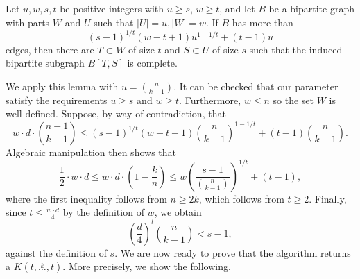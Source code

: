 \documentclass[12pt]{article}
\newcommand{\compoverset}[2]{\ensuremath{K(#2, \overset{#1}{\dots}, #2)}}
\begin{document}
\begin{lemma}\label{thm:kst}
    Let $u, w, s, t$ be positive integers with $u \geq s$, $w \geq t$, and let $B$ be a bipartite graph with parts $W$ and $U$ such that
    $|U| = u, |W| = w$.
    If $B$ has more than \[(s - 1)^{1 / t}(w - t + 1)u^{1 - 1 / t} + (t - 1)u\] edges, then there are
    $T \subset W$ of size $t$ and $S \subset U$ of size $s$ such that the induced bipartite subgraph $B[T, S]$ is complete.
\end{lemma}

We apply this lemma with $u = \binom{n}{k-1}$.
It can be checked that our parameter satisfy the requirements $u \geq s$ and $w \geq t$. %
Furthermore, $w \leq n$ so the set $W$ is well-defined. %
Suppose, by way of contradiction, that
\[
    w \cdot d \cdot \binom{n - 1}{k-1} \leq (s - 1)^{1 / t}(w - t + 1)\binom{n}{k-1}^{1 - 1 / t} + (t - 1)\binom{n}{k-1}.
\]
Algebraic manipulation then shows that
\[
    \frac{1}{2} \cdot w \cdot d
    \leq w \cdot d \cdot \left( 1 - \frac{k}{n} \right)
    \leq w \left( \frac{s-1}{\binom{n}{k-1} } \right)^{1 / t} + (t - 1),
\]
where the first inequality follows from $n \geq 2k$, which follows from $t \geq 2$. %
Finally, since $t \leq \frac{w \cdot d}{4}$ by the definition of $w$, we obtain
\[
    \left( \frac{d}{4}\right)^t \binom{n}{k-1} < s-1,
\]
against the definition of $s$.
We are now ready to prove that the algorithm returns a $\compoverset{k}{t}$.
More precisely, we show the following.
\end{document}
